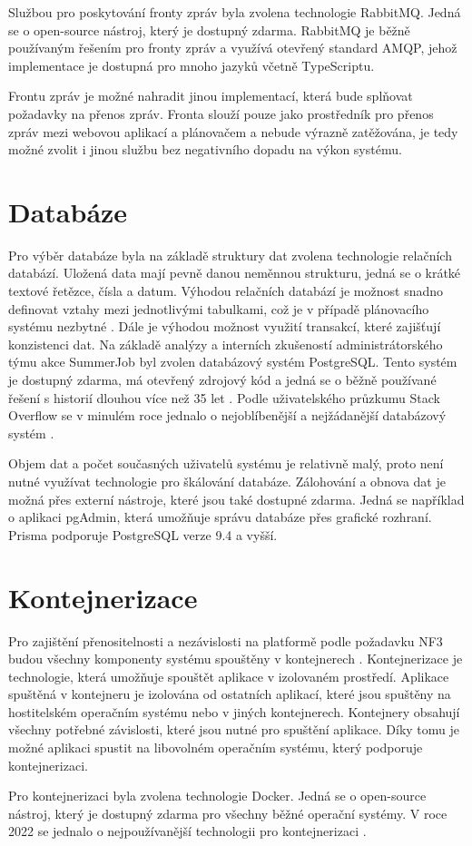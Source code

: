 Službou pro poskytování fronty zpráv byla zvolena technologie RabbitMQ. Jedná se o open-source nástroj, který je dostupný zdarma. RabbitMQ je běžně používaným řešením
pro fronty zpráv \cite{rabbitmq} a využívá otevřený standard AMQP, jehož implementace je dostupná pro mnoho jazyků včetně TypeScriptu.

Frontu zpráv je možné nahradit jinou implementací, která bude splňovat požadavky na přenos zpráv. Fronta slouží pouze jako prostředník pro přenos zpráv mezi webovou aplikací
a plánovačem a nebude výrazně zatěžována, je tedy možné zvolit i jinou službu bez negativního dopadu na výkon systému.


\section{Databáze}

Pro výběr databáze byla na základě struktury dat zvolena technologie relačních databází. Uložená data mají pevně danou neměnnou strukturu,
jedná se o krátké textové řetězce, čísla a datum. Výhodou relačních databází je možnost snadno definovat vztahy mezi jednotlivými tabulkami,
což je v případě plánovacího systému nezbytné \cite{sql_nosql}. Dále je výhodou možnost využití transakcí, které zajišťují konzistenci dat.
Na základě analýzy a interních zkušeností administrátorského týmu akce SummerJob byl zvolen databázový systém PostgreSQL. Tento systém je
dostupný zdarma, má otevřený zdrojový kód a jedná se o běžně používané řešení s historií dlouhou více než 35 let \cite{postgresql}.
Podle uživatelského průzkumu Stack Overflow se v minulém roce jednalo o nejoblíbenější a nejžádanější databázový systém \cite{so_dev_survey_db}.

Objem dat a počet současných uživatelů systému je relativně malý, proto není nutné využívat technologie pro škálování databáze. Zálohování a obnova dat
je možná přes externí nástroje, které jsou také dostupné zdarma. Jedná se například o aplikaci pgAdmin, která umožňuje správu databáze přes grafické rozhraní.
Prisma podporuje PostgreSQL verze 9.4 a vyšší.

\section{Kontejnerizace}

Pro zajištění přenositelnosti a nezávislosti na platformě podle požadavku NF3 budou všechny komponenty systému spouštěny v kontejnerech \cite{what_is_container}.
Kontejnerizace je technologie, která umožňuje spouštět aplikace v izolovaném prostředí. Aplikace spuštěná v kontejneru je izolována od ostatních aplikací,
které jsou spuštěny na hostitelském operačním systému nebo v jiných kontejnerech. Kontejnery obsahují
všechny potřebné závislosti, které jsou nutné pro spuštění aplikace. Díky tomu je možné aplikaci spustit na libovolném operačním systému, který podporuje kontejnerizaci.

Pro kontejnerizaci byla zvolena technologie Docker. Jedná se o open-source nástroj, který je dostupný zdarma pro všechny běžné operační systémy.
V roce 2022 se jednalo o nejpoužívanější technologii pro kontejnerizaci \cite{docker_survey}.

